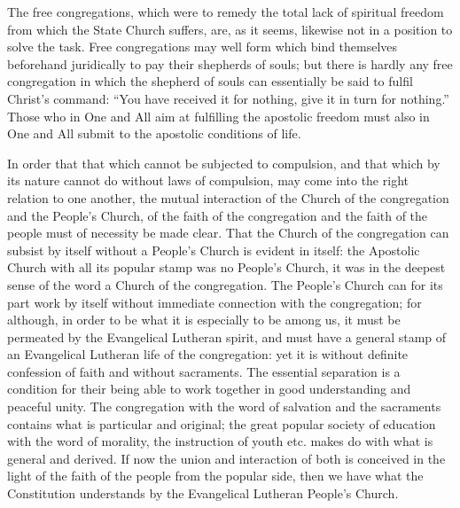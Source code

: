 \documentclass[12pt,a4paper,openany]{book}
\newcommand{\opage}[1]{\marginnote{\footnotesize\textit{[#1]}}}
\begin{document}
The free congregations, which were to remedy the
total lack of spiritual freedom from which the State Church
suffers, are, as it seems, likewise not in a position to
solve the task. Free congregations may well form
which bind themselves beforehand juridically to
pay their shepherds of souls; but there is hardly any
free congregation in which the shepherd of souls can essentially be said
to fulfil Christ's command: ``You have received
it for nothing, give it in turn for nothing.'' Those who in
One and All aim at fulfilling the apostolic
freedom must also in One and All submit to the
apostolic conditions of life.

In order that that which cannot be subjected to compulsion, and
that which by its nature cannot do without laws of compulsion,
may come into the right relation to one another,
the mutual interaction of the Church of the congregation and the People's Church, of the faith of the congregation
and the faith of the people must of necessity be
made clear. That the Church of the congregation can subsist
by itself without a People's Church is evident in itself: the Apostolic Church
with all its popular stamp was no People's Church,
it was in the deepest sense of the word a Church of the congregation.
The People's Church can for its part work by itself
without immediate connection with the congregation; for
although, in order to be what it is especially to be
among us, it must be permeated by the Evangelical Lutheran spirit,
and must have a general stamp of an Evangelical Lutheran
life of the congregation: yet it is without definite confession of faith and without sacraments. The essential
\setcounter{footnote}{0}%
\opage{116}separation is a condition for their being able to work together
in good understanding and peaceful unity. The congregation
with the word of salvation and the sacraments contains what is
particular and original; the great popular society of education
with the word of morality, the instruction of youth
etc. makes do with what is general and derived.
If now the union and interaction of both is conceived in the light of the faith of the people
from the popular side, then we have what
the Constitution understands by the Evangelical Lutheran
People's Church.
\end{document}
